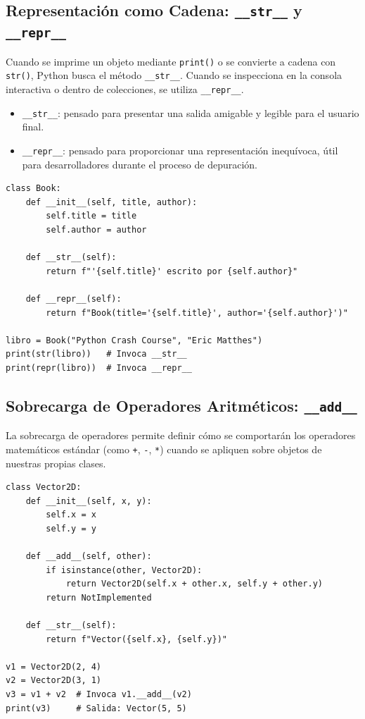 \subsection{Representación como Cadena: \texttt{\_\_str\_\_} y \texttt{\_\_repr\_\_}}
Cuando se imprime un objeto mediante \texttt{print()} o se convierte a cadena con \texttt{str()}, Python busca
el método \texttt{\_\_str\_\_}. Cuando se inspecciona en la consola interactiva o dentro de colecciones, se utiliza \texttt{\_\_repr\_\_}.

\begin{itemize}[leftmargin=*]
  \item \texttt{\_\_str\_\_}: pensado para presentar una salida amigable y legible para el usuario final.
  \item \texttt{\_\_repr\_\_}: pensado para proporcionar una representación inequívoca, útil para desarrolladores durante el proceso de depuración.
\end{itemize}

\begin{lstlisting}[caption={Implementación de \texttt{\_\_str\_\_} y \texttt{\_\_repr\_\_}.}, label={list:str_repr}]
class Book:
    def __init__(self, title, author):
        self.title = title
        self.author = author

    def __str__(self):
        return f"'{self.title}' escrito por {self.author}"

    def __repr__(self):
        return f"Book(title='{self.title}', author='{self.author}')"

libro = Book("Python Crash Course", "Eric Matthes")
print(str(libro))   # Invoca __str__
print(repr(libro))  # Invoca __repr__
\end{lstlisting}

\subsection{Sobrecarga de Operadores Aritméticos: \texttt{\_\_add\_\_}}
La sobrecarga de operadores permite definir cómo se comportarán los operadores matemáticos estándar
(como \texttt{+}, \texttt{-}, \texttt{*}) cuando se apliquen sobre objetos de nuestras propias clases.

\begin{lstlisting}[caption={Sobrecarga del operador suma mediante \texttt{\_\_add\_\_}.}, label={list:vector_add}]
class Vector2D:
    def __init__(self, x, y):
        self.x = x
        self.y = y

    def __add__(self, other):
        if isinstance(other, Vector2D):
            return Vector2D(self.x + other.x, self.y + other.y)
        return NotImplemented

    def __str__(self):
        return f"Vector({self.x}, {self.y})"

v1 = Vector2D(2, 4)
v2 = Vector2D(3, 1)
v3 = v1 + v2  # Invoca v1.__add__(v2)
print(v3)     # Salida: Vector(5, 5)
\end{lstlisting}

